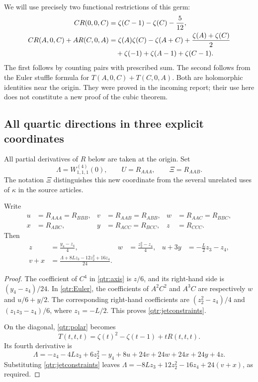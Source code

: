 We will use precisely two functional restrictions of this germ:
\begin{align}
 C R(0,0,C)&=\zeta(C-1)-\zeta(C)-\frac5{12},
 \label{qtr:axis}\\
 C R(A,0,C)+A R(C,0,A)
 &=\zeta(A)\zeta(C)-\zeta(A+C)
 +\frac{\zeta(A)+\zeta(C)}2\notag\\
 &\quad+\zeta(-1)+\zeta(A-1)+\zeta(C-1).
 \label{qtr:Euler}
\end{align}
The first follows by counting pairs with prescribed sum.
The second follows from the Euler stuffle formula for
\(T(A,0,C)+T(C,0,A)\). Both are holomorphic identities near the
origin. They were proved in the incoming report; their use here
does not constitute a new proof of the cubic theorem.

\subsection{All quartic directions in three explicit coordinates}

All partial derivatives of \(R\) below are taken at the origin.
Set
\[
 \Lambda=W_{1,1,1}^{(4)}(0),\qquad
 U=R_{AAA},\qquad \Xi=R_{AAB}.
\]
The notation \(\Xi\) distinguishes this new coordinate from the
several unrelated uses of \(\kappa\) in the source articles.

\begin{lemma}
\label{qtr:constraints}
Write
\begin{align*}
 u&=R_{AAA}=R_{BBB},& v&=R_{AAB}=R_{ABB},&
 w&=R_{AAC}=R_{BBC},\\
 x&=R_{ABC},& y&=R_{ACC}=R_{BCC},& z&=R_{CCC}.
\end{align*}
Then
\begin{align}
 z&=\frac{y_4-z_4}{4},&
 w&=\frac{z_2^2-z_4}{4},&
 u+3y&=-\frac L2z_3-z_4,\label{qtr:jetconstraints}\\
 v+x&=\frac{\Lambda+8Lz_3-12z_2^2+16z_4}{24}.
 \label{qtr:diagonalconstraint}
\end{align}
\end{lemma}

\begin{proof}
The coefficient of \(C^4\) in \eqref{qtr:axis} is \(z/6\),
and its right-hand side is \((y_4-z_4)/24\). In
\eqref{qtr:Euler}, the coefficients of \(A^2C^2\) and
\(A^3C\) are respectively \(w\) and \(u/6+y/2\).
The corresponding right-hand coefficients are
\((z_2^2-z_4)/4\) and
\((z_1z_3-z_4)/6\), where \(z_1=-L/2\).
This proves \eqref{qtr:jetconstraints}.

On the diagonal, \eqref{qtr:polar} becomes
\[
 T(t,t,t)=\zeta(t)^2-\zeta(t-1)+tR(t,t,t).
\]
Its fourth derivative is
\[
 \Lambda=-z_4-4Lz_3+6z_2^2-y_4
             +8u+24v+24w+24x+24y+4z.
\]
Substituting \eqref{qtr:jetconstraints} leaves
\(\Lambda=-8Lz_3+12z_2^2-16z_4+24(v+x)\),
as required.
\end{proof}


